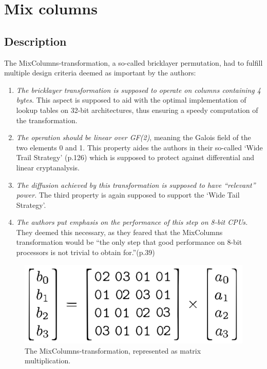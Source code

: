 \hypertarget{mix-columns}{%
\section{Mix columns}\label{mix-columns}}

\hypertarget{description-4}{%
\subsection{Description}\label{description-4}}

The MixColumns-transformation, a so-called bricklayer permutation, had to fulfill
\cite[p.39]{rijndael} multiple design criteria deemed as important by the authors:

\begin{enumerate}
\def\labelenumi{\arabic{enumi}.}

\item
  \emph{The bricklayer transformation is supposed to operate on columns
  containing 4 bytes.} This aspect is supposed to aid with the optimal
  implementation of lookup tables on 32-bit architectures, thus
  ensuring a speedy computation of the transformation.
\item
  \emph{The operation should be linear over GF(2)}, meaning the Galois
  field of the two elements 0 and 1. This property aides the authors in
  their so-called `Wide Trail Strategy' (p.126) which is supposed to
  protect against differential and linear cryptanalysis.
\item
  \emph{The diffusion achieved by this transformation is supposed to
  have ``relevant'' power.} The third property is again supposed to
  support the `Wide Tail Strategy'.
\item
  \emph{The authors put emphasis on the performance of this step on 8-bit
  \ac{CPU}s.} They deemed this necessary, as they feared that the MixColumns
  transformation would be ``the only step that good performance on 8-bit
  processors is not trivial to obtain for.''(p.39)
\end{enumerate}


\begin{figure}
\centering
\includegraphics[scale = 0.2]{data/figures/mixcolumn.png}
\caption{The MixColumns-transformation, represented as matrix multiplication.\cite[p. 40]{rijndael}}
\label{fig:mixcolumn}
\end{figure}

